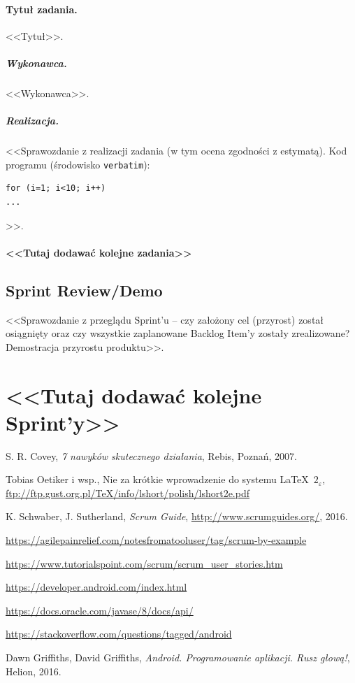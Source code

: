 \documentclass[a4paper]{article}
\begin{document}
\paragraph{Tytuł zadania.} <<Tytuł>>.
\subparagraph{Wykonawca.} <<Wykonawca>>.
\subparagraph{Realizacja.} <<Sprawozdanie z realizacji zadania (w tym ocena zgodności z estymatą). Kod programu (środowisko \texttt{verbatim}): \begin{verbatim}
for (i=1; i<10; i++)
...
\end{verbatim}>>.

\paragraph{<<Tutaj dodawać kolejne zadania>>}


\subsection{Sprint Review/Demo}
<<Sprawozdanie z przeglądu Sprint'u -- czy założony cel (przyrost) został osiągnięty oraz czy wszystkie zaplanowane Backlog Item'y zostały zrealizowane? Demostracja przyrostu produktu>>.
\section*{<<Tutaj dodawać kolejne Sprint'y>>}


\begin{thebibliography}{9}

 S. R. Covey, {\em 7 nawyków skutecznego działania}, Rebis, Poznań, 2007.

 Tobias Oetiker i wsp., Nie za krótkie wprowadzenie do systemu \LaTeX  \ $2_\varepsilon$, \url{ftp://ftp.gust.org.pl/TeX/info/lshort/polish/lshort2e.pdf}

 K. Schwaber, J. Sutherland, {\em Scrum Guide}, \url{http://www.scrumguides.org/}, 2016.

 \url{https://agilepainrelief.com/notesfromatooluser/tag/scrum-by-example}

 \url{https://www.tutorialspoint.com/scrum/scrum_user_stories.htm}

 \url{https://developer.android.com/index.html}

 \url{https://docs.oracle.com/javase/8/docs/api/}

 \url{https://stackoverflow.com/questions/tagged/android}

 Dawn Griffiths, David Griffiths, {\em Android. Programowanie aplikacji. Rusz głową!}, Helion, 2016.

\end{thebibliography}
\end{document}
